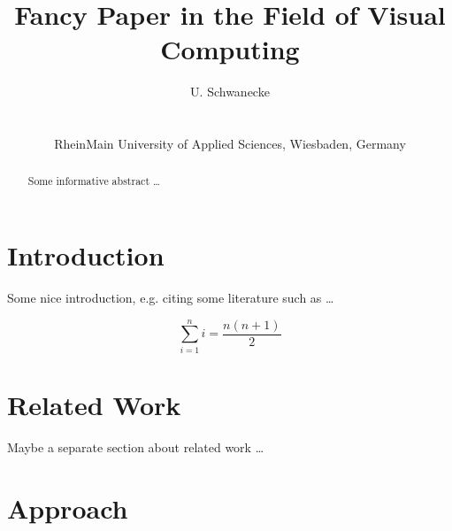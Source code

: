 \documentclass{egpubl}
\title[Fancy 3D Animation Demo]%
      {Fancy Paper in the Field of Visual Computing}
\author[U. Schwanecke]
    {\parbox{\textwidth}
        {\centering 
			U. Schwanecke
        }
        \\
    {\parbox{\textwidth}
        {\centering RheinMain University of Applied Sciences, Wiesbaden, Germany\\
       }
    }
}
\begin{document}


\maketitle


\begin{abstract}
Some informative abstract \ldots
\blindtext
\end{abstract}  


\section{Introduction}
\label{sec:introduction}
Some nice introduction, e.g. citing some literature such as \cite{Tjaden2017, Achenbach2018, Sommer2020} \ldots 

$$
\sum_{i=1}^n i = \frac{n(n+1)}{2}
$$
\blindtext


\section{Related Work}
\label{sec:related_work}
Maybe a separate section about related work \ldots 
\blindtext


\section{Approach}
\label{sec:approach}
\blindtext
\end{document}
